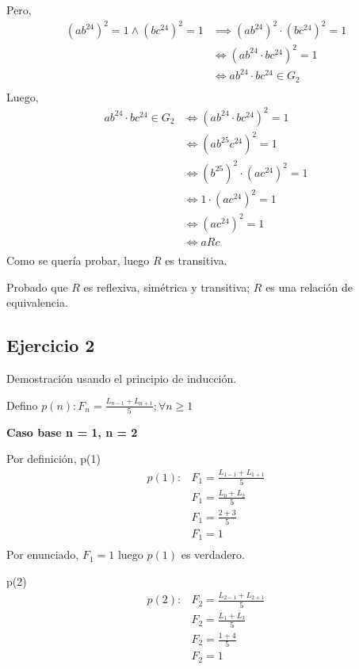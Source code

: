 Pero,
\begin{align*}
    (ab^{24})^2 = 1 \wedge (bc^{24})^2 = 1 &\implies (ab^{24})^2 \cdot (bc^{24})^2 = 1 \\
    &\iff (ab^{24}  \cdot bc^{24})^2 = 1 \\
    &\iff ab^{24} \cdot bc^{24} \in G_2 \\
\end{align*}
Luego,
\begin{align*}
    ab^{24} \cdot bc^{24} \in G_2 &\iff (ab^{24} \cdot bc^{24})^2 = 1 \\
    &\iff (ab^{25}c^{24})^2 = 1 \\
    &\iff (b^{25})^2 \cdot (ac^{24})^2 = 1 \\
    &\iff 1 \cdot (ac^{24})^2 = 1 \\
    &\iff (ac^{24})^2 = 1 \\
    &\iff aRc \\
\end{align*}
Como se quería probar, luego $R$ es transitiva.

Probado que $R$ es reflexiva, simétrica y transitiva; $R$ es una relación de equivalencia.

\subsection{Ejercicio 2}

Demostración usando el principio de inducción.

Defino $ p(n): F_n = \frac{L_{n-1} + L_{n+1}}{5}; \forall n \geq 1 $

\textbf{Caso base n = 1, n = 2 }

Por definición, p(1)
\begin{align*}
    p(1): &F_1 = \frac{L_{1-1} + L_{1+1}}{5} \\
    &F_1 = \frac{L_{0} + L_{2}}{5} \\
    &F_1 = \frac{2+3}{5} \\
    &F_1 = 1 \\
\end{align*}
Por enunciado, $ F_1 = 1 $ luego $p(1)$ es verdadero.

p(2)
\begin{align*}
    p(2): &F_2 = \frac{L_{2-1} + L_{2+1}}{5} \\
    &F_2 = \frac{L_{1} + L_{3}}{5} \\
    &F_2 = \frac{1+4}{5} \\
    &F_2 = 1 \\
\end{align*}

